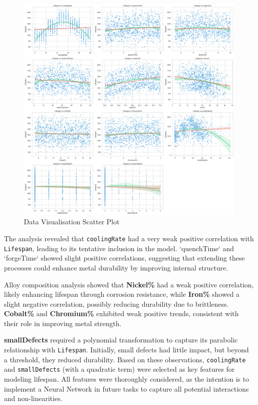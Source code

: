 \documentclass{article}
\begin{document}
\begin{figure}[htbp]
    \centering
    \includegraphics[width=1\textwidth]{./Images/DataVisualisationScatterPlot.png}
    \caption{Data Visualisation Scatter Plot}
    \label{fig:data_visualisation_scatter_plot}
\end{figure}

The analysis revealed that \texttt{coolingRate} had a very weak positive correlation with \texttt{Lifespan}, leading to its tentative inclusion in the model. `quenchTime` and `forgeTime` showed slight positive correlations, suggesting that extending these processes could enhance metal durability by improving internal structure.

Alloy composition analysis showed that \textbf{Nickel\%} had a weak positive correlation, likely enhancing lifespan through corrosion resistance, while \textbf{Iron\%} showed a slight negative correlation, possibly reducing durability due to brittleness. \textbf{Cobalt\%} and \textbf{Chromium\%} exhibited weak positive trends, consistent with their role in improving metal strength.

\textbf{smallDefects} required a polynomial transformation to capture its parabolic relationship with \texttt{Lifespan}. Initially, small defects had little impact, but beyond a threshold, they reduced durability. Based on these observations, \texttt{coolingRate} and \texttt{smallDefects} (with a quadratic term) were selected as key features for modeling lifespan. All features were thoroughly considered, as the intention is to implement a Neural Network in future tasks to capture all potential interactions and non-linearities.
\end{document}
